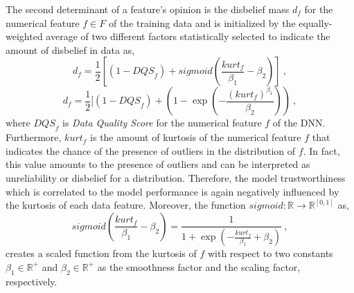 The second determinant of a feature's opinion is the disbelief mass $d_{f}$ for the numerical feature $f \in F$ of the training data and is initialized by the equally-weighted average of two different factors statistically selected to indicate the amount of disbelief in data as,
{\color{red}
\begin{equation}
d_{f} = \frac{1}{2}[(1 - {DQS}_{f}) + sigmoid(\frac{{kurt}_{f}}{{\beta}_1} - {\beta}_2)]\ ,
\end{equation}
}
{\color{blue}
\begin{equation}
d_{f} = \frac{1}{2}[(1 - {DQS}_{f}) + (1-\exp(-\frac{({kurt}_{f})^{\beta_1}}{\beta_2}))\ ,
\label{num_d}
\end{equation}
}
where ${DQS}_{f}$ is \emph{Data Quality Score} for the numerical feature $f$ of the DNN. Furthermore, ${kurt}_{f}$ is the amount of kurtosis of the numerical feature $f$ that indicates the chance of the presence of outliers in the distribution of $f$. In fact, this value amounts to the presence of outliers and can be interpreted as unreliability or disbelief for a distribution. {\color{blue} Therefore, the model trustworthiness which is correlated to the model performance is again negatively influenced by the kurtosis of each data feature.}
{\color{red} Moreover, the function $sigmoid: \mathbb{R} \rightarrow \mathbb{R}^{[0,1]}$ as,
\begin{equation}
sigmoid(\frac{{kurt}_{f}}{{\beta}_1} - {\beta}_2)=\frac{1}{1+\exp(-\frac{{kurt}_{f}}{{\beta}_1} + {\beta}_2)}\ ,
\end{equation}
creates a scaled function from the kurtosis of $f$ with respect to two constants ${\beta}_1 \in \mathbb{R}^+$ and ${\beta}_2 \in \mathbb{R}^+$ as the smoothness factor and the scaling factor, respectively.} 

